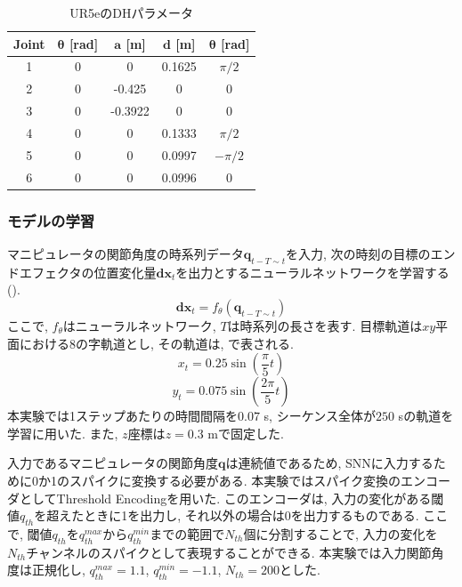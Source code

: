 \begin{table}[htb]
    \centering
    \caption[UR5eのDHパラメータ]{
        UR5eのDHパラメータ\cite{ur5e}
    }
    \label{tab:ur5e:dh}
    \begin{tabular}{ccccc}
        \hline
        \textbf{Joint} & $\bm{\theta}$ [rad] & $\bm{a}$ [m]& $\bm{d}$ [m]& $\bm{\theta}$ [rad]\\
        \hline
        1 & 0 & 0       & 0.1625 & $\pi/2$\\
        2 & 0 & -0.425  & 0       & 0\\
        3 & 0 & -0.3922 & 0       & 0\\
        4 & 0 & 0       & 0.1333 & $\pi/2$\\
        5 & 0 & 0       & 0.0997 & $-\pi/2$\\
        6 & 0 & 0       & 0.0996 & 0\\
        \hline
    \end{tabular}
\end{table}


\subsubsection{モデルの学習}
マニピュレータの関節角度の時系列データ$\bm{q}_{t-T \sim t}$を入力, 次の時刻の目標のエンドエフェクタの位置変化量$\bm{dx}_{t}$を出力とするニューラルネットワークを学習する ().
\begin{equation}
    \bm{dx}_{t} = f_{\theta}(\bm{q}_{t-T \sim t}) \label{eq:model:learning}
\end{equation}
ここで, $f_{\theta}$はニューラルネットワーク, $T$は時系列の長さを表す.
目標軌道は$xy$平面における8の字軌道とし, その軌道は, で表される.
\begin{equation}
    x_t=0.25 \sin (\frac{\pi}{5} t) \label{eq:model:target_trajectoryx}
\end{equation}
\begin{equation}
    y_t=0.075 \sin (\frac{2\pi}{5} t) \label{eq:model:target_trajectoryy}
\end{equation}
本実験では1ステップあたりの時間間隔を$0.07$ s, シーケンス全体が$250$ sの軌道を学習に用いた.
また, $z$座標は$z=0.3$ mで固定した.

入力であるマニピュレータの関節角度$\bm{q}$は連続値であるため, SNNに入力するために0か1のスパイクに変換する必要がある.
本実験ではスパイク変換のエンコーダとしてThreshold Encodingを用いた.
このエンコーダは, 入力の変化がある閾値$q_{th}$を超えたときに1を出力し, それ以外の場合は0を出力するものである.
ここで, 閾値$q_{th}$を$q_{th}^{max}$から$q_{th}^{min}$までの範囲で$N_{th}$個に分割することで, 入力の変化を$N_{th}$チャンネルのスパイクとして表現することができる.
本実験では入力関節角度は正規化し, $q_{th}^{max}=1.1$, $q_{th}^{min}=-1.1$, $N_{th}=200$とした.

